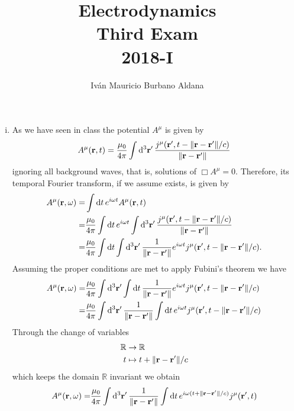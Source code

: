 \documentclass{article}
\title{Electrodynamics\\
Third Exam\\
2018-I}
\author{Iván Mauricio Burbano Aldana}
\begin{document}
\maketitle

\begin{enumerate}[(i)]

\item As we have seen in class the potential $A^\mu$ is given by
\begin{equation}
A^\mu(\vb{r},t)=\frac{\mu_0}{4\pi}\int \dd[3]{\vb{r}'}\frac{j^\mu(\vb{r}',t-\|\vb{r}-\vb{r}'\|/c)}{\|\vb{r}-\vb{r}'\|}
\end{equation}
ignoring all background waves, that is, solutions of $\Box A^\mu=0$. Therefore, its temporal Fourier transform, if we assume exists, is given by
\begin{align}
\begin{split}
A^\mu(\vb{r},\omega)=&\int\dd{t}e^{i\omega t}A^\mu(\vb{r},t)\\
=&\frac{\mu_0}{4\pi}\int\dd{t}e^{i\omega t}\int \dd[3]{\vb{r}'}\frac{j^\mu(\vb{r}',t-\|\vb{r}-\vb{r}'\|/c)}{\|\vb{r}-\vb{r}'\|}\\
=&\frac{\mu_0}{4\pi}\int\dd{t}\int\dd[3]{\vb{r}'}\frac{1}{\|\vb{r}-\vb{r}'\|}e^{i\omega t}j^\mu(\vb{r}',t-\|\vb{r}-\vb{r}'\|/c).
\end{split}
\end{align}
Assuming the proper conditions are met to apply Fubini's theorem we have
\begin{align}
\begin{split}
A^\mu(\vb{r},\omega)=&\frac{\mu_0}{4\pi}\int\dd[3]{\vb{r}'}\int\dd{t}\frac{1}{\|\vb{r}-\vb{r}'\|}e^{i\omega t}j^\mu(\vb{r}',t-\|\vb{r}-\vb{r}'\|/c)\\
=&\frac{\mu_0}{4\pi}\int \dd[3]{\vb{r}'}\frac{1}{\|\vb{r}-\vb{r}'\|}\int\dd{t}e^{i\omega t}j^\mu(\vb{r}',t-\|\vb{r}-\vb{r}'\|/c)
\end{split}
\end{align}
Through the change of variables
\begin{align}
\begin{split}
\mathbb{R}&\rightarrow\mathbb{R}\\
t&\mapsto t+\|\vb{r}-\vb{r}'\|/c
\end{split}
\end{align}
which keeps the domain $\mathbb{R}$ invariant we obtain
\begin{align}
\begin{split}
A^\mu(\vb{r},\omega)=&\frac{\mu_0}{4\pi}\int \dd[3]{\vb{r}'}\frac{1}{\|\vb{r}-\vb{r}'\|}\int\dd{t}e^{i\omega(t+\|\vb{r}-\vb{r}'\|/c)}j^\mu(\vb{r}',t)\\

\end{split}
\end{align}
\end{enumerate}
\end{document}
